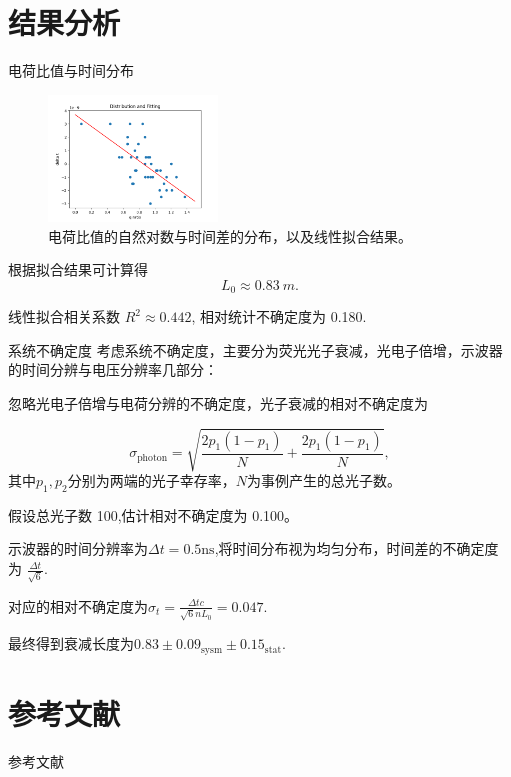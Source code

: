 \documentclass[10pt]{beamer}
\begin{document}
\section{结果分析}
\label{sec:orgc25006c}
\begin{frame}[label={sec:org93946de}]{电荷比值与时间分布}
\begin{figure}[htbp]
\centering
\includegraphics[width=0.4\textwidth]{../AttenuationLength/figs/dist.png}
\caption{电荷比值的自然对数与时间差的分布，以及线性拟合结果。}
\end{figure}

根据拟合结果可计算得
\begin{equation}
\label{eq:3}
L_0 \approx \qty{0.83}{m}.
\end{equation}

线性拟合相关系数 \(R^2 \approx 0.442\), 相对统计不确定度为 0.180.
\end{frame}

\begin{frame}{系统不确定度}
    考虑系统不确定度，主要分为荧光光子衰减，光电子倍增，示波器的时间分辨与电压分辨率几部分：

    忽略光电子倍增与电荷分辨的不确定度，光子衰减的相对不确定度为

    \begin{equation}
    \label{eq:4}
    \sigma_\mathrm{photon}=\sqrt{\frac{2p_1(1-p_1)}{N}+\frac{2p_1(1-p_1)}{N}},
    \end{equation}
    其中$p_1,p_2$分别为两端的光子幸存率，$N$为事例产生的总光子数。
    
    假设总光子数 100,估计相对不确定度为 0.100。

    示波器的时间分辨率为$\Delta t=0.5\mathrm{ns}$,将时间分布视为均匀分布，时间差的不确定度为 $\frac{\Delta t}{\sqrt{6}}$.

    对应的相对不确定度为$\sigma_t=\frac{\Delta tc}{\sqrt{6}nL_0}=0.047.$

    最终得到衰减长度为$0.83\pm0.09_{\mathrm{sysm}}\pm0.15_{\mathrm{stat}}.$
\end{frame}
\section{参考文献}
\label{sec:orgf6ca842}
\begin{frame}[allowframebreaks]{参考文献}
\end{frame}
\end{document}
